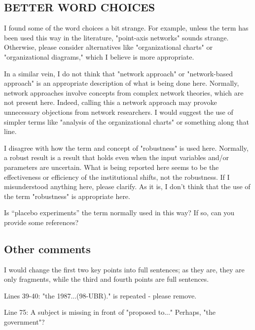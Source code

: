 \subsection{BETTER WORD CHOICES}\label{sec:1-2}
\RC{} I found some of the word choices a bit strange. For example, unless the term has been used this way in the literature, "point-axis networks" sounds strange. Otherwise, please consider alternatives like "organizational charts" or "organizational diagrams," which I believe is more appropriate.

\RC{} In a similar vein, I do not think that "network approach" or "network-based approach" is an appropriate description of what is being done here. Normally, network approaches involve concepts from complex network theories, which are not present here. Indeed, calling this a network approach may provoke unnecessary objections from network researchers. I would suggest the use of simpler terms like "analysis of the organizational charts" or something along that line.

\RC{} I disagree with how the term and concept of "robustness" is used here. Normally, a robust result is a result that holds even when the input variables and/or parameters are uncertain. What is being reported here seems to be the effectiveness or efficiency of the institutional shifts, not the robustness. If I misunderstood anything here, please clarify. As it is, I don't think that the use of the term "robustness" is appropriate here.

\RC{} Is ``placebo experiments'' the term normally used in this way? If so, can you provide some references?

\subsection{Other comments}\label{sec:1-3}
\RC{} I would change the first two key points into full sentences; as they are, they are only fragments, while the third and fourth points are full sentences.

\RC{} Lines 39-40: "the 1987...(98-UBR)." is repeated - please remove.

\RC{} Line 75: A subject is missing in front of "proposed to..." Perhaps, "the government"?

